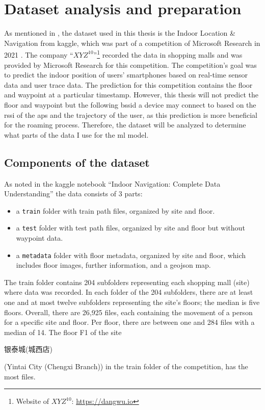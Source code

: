 \chapter{Dataset analysis and preparation}\label{ch:data-ana}

As mentioned in , the dataset used in this thesis is the Indoor Location \& Navigation from kaggle, which was part of a competition of Microsoft Research in 2021 \cite{IndoorLocationNavigation}.
The company ``\(XYZ^{10}\)''\footnote{Website of \(XYZ^{10}\): \url{https://dangwu.io}} recorded the data in shopping malls and was provided by Microsoft Research for this competition.
The competition's goal was to predict the indoor position of users' smartphones based on real-time sensor data and user trace data.
The prediction for this competition contains the floor and waypoint at a particular timestamp.
However, this thesis will not predict the floor and waypoint but the following \ac{bssid} a device may connect to based on the \ac{rssi} of the \acp{ap} and the trajectory of the user, as this prediction is more beneficial for the roaming process.
Therefore, the dataset will be analyzed to determine what parts of the data I use for the \ac{ml} model.

\section{Components of the dataset}\label{sec:data}
As noted in the kaggle notebook ``Indoor Navigation: Complete Data Understanding'' \cite{IndoorNavigationUnderstanding} the data consists of 3 parts:

\begin{itemize}
    \item a \texttt{train} folder with train path files, organized by site and floor.
    \item a \texttt{test} folder with test path files, organized by site and floor but without waypoint data.
    \item a \texttt{metadata} folder with floor metadata, organized by site and floor, which includes floor images, further information, and a geojson map.
\end{itemize}

The train folder contains 204 subfolders representing each shopping mall (site) where data was recorded.
In each folder of the 204 subfolders, there are at least one and at most twelve subfolders representing the site's floors; the median is five floors.
Overall, there are 26,925 files, each containing the movement of a person for a specific site and floor.
Per floor, there are between one and 284 files with a median of 14.
The floor F1 of the site \begin{CJK*}{UTF8}{gbsn}银泰城(城西店)\end{CJK*} (Yintai City (Chengxi Branch)) in the train folder of the competition, has the most files.

